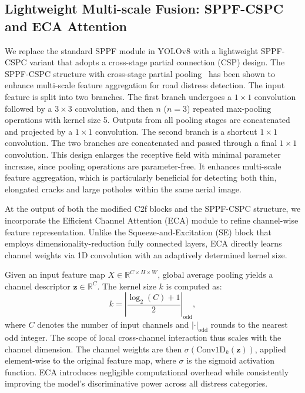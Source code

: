 \documentclass{ieeeaccess}
\begin{document}
\subsection{Lightweight Multi-scale Fusion: SPPF-CSPC and ECA Attention}

We replace the standard SPPF module in YOLOv8 with a lightweight SPPF-CSPC variant that adopts a cross-stage partial connection (CSP) design. The SPPF-CSPC structure with cross-stage partial pooling~\cite{xu2025sppfcspc} has been shown to enhance multi-scale feature aggregation for road distress detection. The input feature is split into two branches. The first branch undergoes a $1\times1$ convolution followed by a $3\times3$ convolution, and then $n$ ($n=3$) repeated max-pooling operations with kernel size 5. Outputs from all pooling stages are concatenated and projected by a $1\times1$ convolution. The second branch is a shortcut $1\times1$ convolution. The two branches are concatenated and passed through a final $1\times1$ convolution. This design enlarges the receptive field with minimal parameter increase, since pooling operations are parameter-free. It enhances multi-scale feature aggregation, which is particularly beneficial for detecting both thin, elongated cracks and large potholes within the same aerial image.

At the output of both the modified C2f blocks and the SPPF-CSPC structure, we incorporate the Efficient Channel Attention (ECA) module to refine channel-wise feature representation. Unlike the Squeeze-and-Excitation (SE) block that employs dimensionality-reduction fully connected layers, ECA directly learns channel weights via 1D convolution with an adaptively determined kernel size.

Given an input feature map $X \in \mathbb{R}^{C \times H \times W}$, global average pooling yields a channel descriptor $\mathbf{z} \in \mathbb{R}^C$. The kernel size $k$ is computed as:
\begin{equation}
k = \left| \frac{\log_2(C) + 1}{2} \right|_{\text{odd}},
\end{equation}
where $C$ denotes the number of input channels and $|\cdot|_{\text{odd}}$ rounds to the nearest odd integer. The scope of local cross-channel interaction thus scales with the channel dimension. The channel weights are then $\sigma(\text{Conv1D}_{k}(\mathbf{z}))$, applied element-wise to the original feature map, where $\sigma$ is the sigmoid activation function. ECA introduces negligible computational overhead while consistently improving the model's discriminative power across all distress categories.
\end{document}
